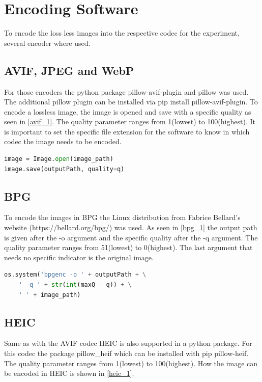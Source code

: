 \documentclass{article}
\begin{document}
\section{Encoding Software}
\label{sec: encoder}

To encode the loss less images into the respective codec for the experiment, several encoder where used. 
\subsection{AVIF, JPEG and WebP}
For those encoders the python package pillow-avif-plugin and pillow was used. The additional pillow plugin can be installed via pip install pillow-avif-plugin. To encode a lossless image, the image is opened and save with a specific quality as seen in \ref{avif_1}. The quality parameter ranges from 1(lowest) to 100(highest). It is important to set the specific file extension for the software to 
know in which codec the image needs to be encoded.
\begin{lstlisting}[label={avif_1}, language=Python, caption=Encode AVIF\, JPEG and WebP]
image = Image.open(image_path)
image.save(outputPath, quality=q)
\end{lstlisting}

\subsection{BPG}
To encode the images in BPG the Linux distribution from Fabrice Bellard's website (https://bellard.org/bpg/) was used. As seen in \ref{bpg_1} the output path is given after the -o argument and the specific quality after the -q argument. The quality parameter ranges from 51(lowest) to 0(highest). The last argument that needs no specific indicator is the original image.

\begin{lstlisting}[label={bpg_1}, language=Python, caption=Encode BPG]
os.system('bpgenc -o ' + outputPath + \
    ' -q ' + str(int(maxQ - q)) + \
    ' ' + image_path)
\end{lstlisting}

\subsection{HEIC}
Same as with the AVIF codec HEIC is also supported in a python package. For this codec the package pillow\_heif which can be installed with pip pillow-heif. The quality parameter ranges from 1(lowest) to 100(highest).
How the image can be encoded in HEIC is shown in \ref{heic_1}.
\end{document}
